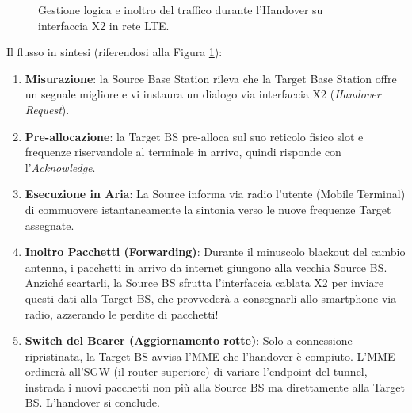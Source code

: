 \begin{figure}[H]
    \centering
    \caption{Gestione logica e inoltro del traffico durante l'Handover su interfaccia X2 in rete LTE.}
    \label{fig:lte-handover}
\end{figure}

Il flusso in sintesi (riferendosi alla Figura \ref{fig:lte-handover}):
\begin{enumerate}
    \item \textbf{Misurazione}: la Source Base Station rileva che la Target Base Station offre un segnale migliore e vi instaura un dialogo via interfaccia X2 (\textit{Handover Request}).
    \item \textbf{Pre-allocazione}: la Target BS pre-alloca sul suo reticolo fisico slot e frequenze riservandole al terminale in arrivo, quindi risponde con l'\textit{Acknowledge}.
    \item \textbf{Esecuzione in Aria}: La Source informa via radio l'utente (Mobile Terminal) di commuovere istantaneamente la sintonia verso le nuove frequenze Target assegnate.
    \item \textbf{Inoltro Pacchetti (Forwarding)}: Durante il minuscolo blackout del cambio antenna, i pacchetti in arrivo da internet giungono alla vecchia Source BS. Anziché scartarli, la Source BS sfrutta l'interfaccia cablata X2 per inviare questi dati alla Target BS, che provvederà a consegnarli allo smartphone via radio, azzerando le perdite di pacchetti!
    \item \textbf{Switch del Bearer (Aggiornamento rotte)}: Solo a connessione ripristinata, la Target BS avvisa l'MME che l'handover è compiuto. L'MME ordinerà all'SGW (il router superiore) di variare l'endpoint del tunnel, instrada i nuovi pacchetti non più alla Source BS ma direttamente alla Target BS. L'handover si conclude.
\end{enumerate}